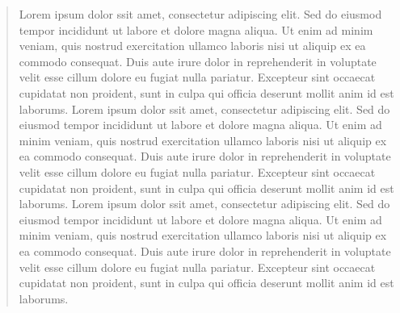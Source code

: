 \documentclass{skripsi}
\begin{document}
\frontmatter
\onehalfspacing
\tableofcontents
\begin{abstract}
    \noindent
    Lorem ipsum dolor ssit amet, consectetur adipiscing elit. Sed do eiusmod tempor incididunt ut labore et dolore magna aliqua. Ut enim ad minim veniam, quis nostrud exercitation ullamco laboris nisi ut aliquip ex ea commodo consequat. Duis aute irure dolor in reprehenderit in voluptate velit esse cillum dolore eu fugiat nulla pariatur. Excepteur sint occaecat cupidatat non proident, sunt in culpa qui officia deserunt mollit anim id est laborums. Lorem ipsum dolor ssit amet, consectetur adipiscing elit. Sed do eiusmod tempor incididunt ut labore et dolore magna aliqua. Ut enim ad minim veniam, quis nostrud exercitation ullamco laboris nisi ut aliquip ex ea commodo consequat. Duis aute irure dolor in reprehenderit in voluptate velit esse cillum dolore eu fugiat nulla pariatur. Excepteur sint occaecat cupidatat non proident, sunt in culpa qui officia deserunt mollit anim id est laborums. Lorem ipsum dolor ssit amet, consectetur adipiscing elit. Sed do eiusmod tempor incididunt ut labore et dolore magna aliqua. Ut enim ad minim veniam, quis nostrud exercitation ullamco laboris nisi ut aliquip ex ea commodo consequat. Duis aute irure dolor in reprehenderit in voluptate velit esse cillum dolore eu fugiat nulla pariatur. Excepteur sint occaecat cupidatat non proident, sunt in culpa qui officia deserunt mollit anim id est laborums. \par
\end{abstract}%
\begin{otherlanguage}{english}
    \begin{itshape}
        \begin{abstract}
            \noindent \lipsum[1-10] \par
        \end{abstract}%
    \end{itshape}
\end{otherlanguage}
\end{document}

